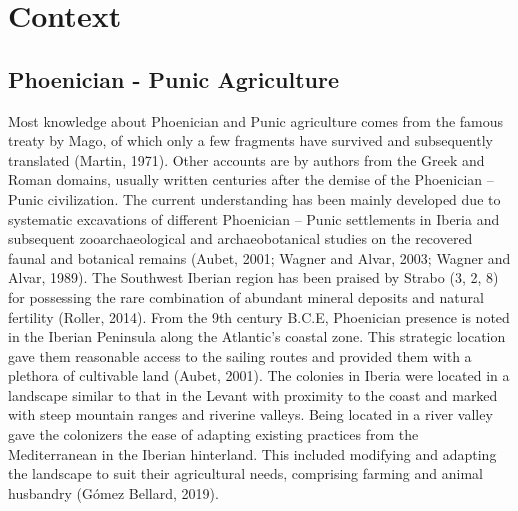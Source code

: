 \documentclass[5p]{elsarticle} %
\begin{document}
\hypertarget{context}{%
\section{Context}\label{context}}

\hypertarget{phoenician---punic-agriculture}{%
\subsection{Phoenician - Punic Agriculture}\label{phoenician---punic-agriculture}}

Most knowledge about Phoenician and Punic agriculture comes from the famous treaty by Mago, of which only a few fragments have survived and subsequently translated (Martin, 1971). Other accounts are by authors from the Greek and Roman domains, usually written centuries after the demise of the Phoenician -- Punic civilization. The current understanding has been mainly developed due to systematic excavations of different Phoenician -- Punic settlements in Iberia and subsequent zooarchaeological and archaeobotanical studies on the recovered faunal and botanical remains (Aubet, 2001; Wagner and Alvar, 2003; Wagner and Alvar, 1989).
The Southwest Iberian region has been praised by Strabo (3, 2, 8) for possessing the rare combination of abundant mineral deposits and natural fertility (Roller, 2014). From the 9th century B.C.E, Phoenician presence is noted in the Iberian Peninsula along the Atlantic's coastal zone. This strategic location gave them reasonable access to the sailing routes and provided them with a plethora of cultivable land (Aubet, 2001). The colonies in Iberia were located in a landscape similar to that in the Levant with proximity to the coast and marked with steep mountain ranges and riverine valleys. Being located in a river valley gave the colonizers the ease of adapting existing practices from the Mediterranean in the Iberian hinterland. This included modifying and adapting the landscape to suit their agricultural needs, comprising farming and animal husbandry (Gómez Bellard, 2019).
\end{document}
